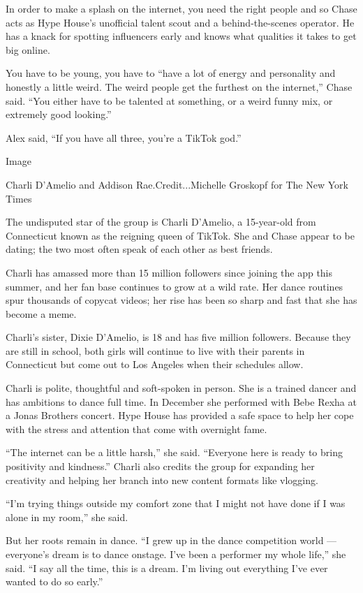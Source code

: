 In order to make a splash on the internet, you need the right people and
so Chase acts as Hype House's unofficial talent scout and a
behind-the-scenes operator. He has a knack for spotting influencers
early and knows what qualities it takes to get big online.

You have to be young, you have to ``have a lot of energy and personality
and honestly a little weird. The weird people get the furthest on the
internet,'' Chase said. ``You either have to be talented at something,
or a weird funny mix, or extremely good looking.''

Alex said, ``If you have all three, you're a TikTok god.''

Image

Charli D'Amelio and Addison Rae.Credit...Michelle Groskopf for The New
York Times

The undisputed star of the group is Charli D'Amelio, a 15-year-old from
Connecticut known as the reigning queen of TikTok. She and Chase appear
to be dating; the two most often speak of each other as best friends.

Charli has amassed more than 15 million followers since joining the app
this summer, and her fan base continues to grow at a wild rate. Her
dance routines spur thousands of copycat videos; her rise has been so
sharp and fast that she has become a meme.

Charli's sister, Dixie D'Amelio, is 18 and has five million followers.
Because they are still in school, both girls will continue to live with
their parents in Connecticut but come out to Los Angeles when their
schedules allow.

Charli is polite, thoughtful and soft-spoken in person. She is a trained
dancer and has ambitions to dance full time. In December she performed
with Bebe Rexha at a Jonas Brothers concert. Hype House has provided a
safe space to help her cope with the stress and attention that come with
overnight fame.

``The internet can be a little harsh,'' she said. ``Everyone here is
ready to bring positivity and kindness.'' Charli also credits the group
for expanding her creativity and helping her branch into new content
formats like vlogging.

``I'm trying things outside my comfort zone that I might not have done
if I was alone in my room,'' she said.

But her roots remain in dance. ``I grew up in the dance competition
world --- everyone's dream is to dance onstage. I've been a performer my
whole life,'' she said. ``I say all the time, this is a dream. I'm
living out everything I've ever wanted to do so early.''


